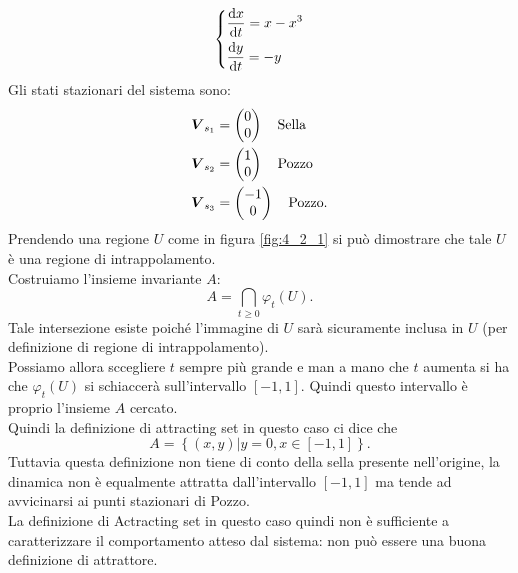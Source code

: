 \begin{exmp}
    \[
    \begin{dcases}
    \frac{\text{d} x}{\text{d} t} = x-x^3\\
    \frac{\text{d} y}{\text{d} t} = -y	
    \end{dcases}
    \]
    Gli stati stazionari del sistema sono: 
    \[\begin{aligned}
	& \boldsymbol{V}_{s_1} = \begin{pmatrix} 0 \\ 0 \end{pmatrix} \quad  \text{Sella}\\
	& \boldsymbol{V}_{s_2} = \begin{pmatrix} 1 \\ 0 \end{pmatrix} \quad  \text{Pozzo}\\
	& \boldsymbol{V}_{s_3} = \begin{pmatrix} -1 \\ 0 \end{pmatrix} \quad  \text{Pozzo}
    .\end{aligned}\]
    Prendendo una regione $U$ come in figura \ref{fig:4_2_1} si può dimostrare che tale $U$ è una regione di intrappolamento.\\
    Costruiamo l'insieme invariante $A$:
    \[
	A = \bigcap\limits_{t\ge 0}\varphi_t(U) 
    .\] 
    Tale intersezione esiste poiché l'immagine di $U$ sarà sicuramente inclusa in $U$ (per definizione di regione di intrappolamento).\\
    Possiamo allora sccegliere $t$ sempre più grande e man a mano che $t$ aumenta si ha che $\varphi_t(U)$ si schiaccerà sull'intervallo $\left[-1, 1\right]$. Quindi questo intervallo è proprio l'insieme $A$ cercato.\\
    Quindi la definizione di attracting set in questo caso ci dice che 
    \[
        A = \left\{(x, y) | y = 0, x \in \left[-1, 1\right] \right\}
    .\] 
    Tuttavia questa definizione non tiene di conto della sella presente nell'origine, la dinamica non è equalmente attratta dall'intervallo $\left[-1, 1\right]$ ma tende ad avvicinarsi ai punti stazionari di Pozzo. \\
    La definizione di Actracting set in questo caso quindi non è sufficiente a caratterizzare il comportamento atteso dal sistema: non può essere una buona definizione di attrattore.
\end{exmp}
